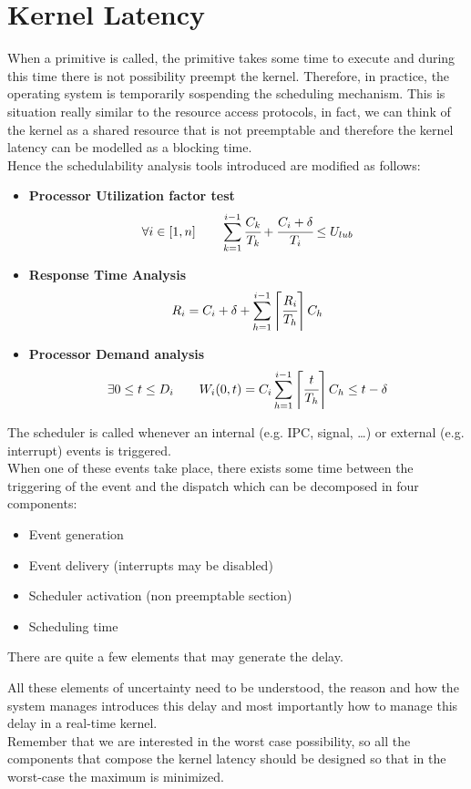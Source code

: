 \section{Kernel Latency}
When a primitive is called, the primitive takes some time to execute and during this time there is not possibility preempt the kernel. Therefore, in practice, the operating system is temporarily sospending the scheduling mechanism. This is situation really similar to the resource access protocols, in fact, we can think of the kernel as a shared resource that is not preemptable and therefore the kernel latency can be modelled as a blocking time.\\
Hence the schedulability analysis tools introduced are modified as follows:
\begin{itemize}
    \item \textbf{Processor Utilization factor test}
     \[\forall i \in [1,n] \qquad\sum_{k=1}^{i-1} \cfrac{C_k}{T_k} + \cfrac{C_i + \delta}{T_i} \le U_{lub}\]
    \item \textbf{Response Time Analysis}
    \[R_i = C_i + \delta + \sum_{h=1}^{i-1}\left\lceil \cfrac{R_i}{T_h} \right\rceil C_h\]
    \item \textbf{Processor Demand analysis}
    \[\exists 0\le t\le D_i\qquad W_i(0,t) = C_i \sum_{h=1}^{i-1}\left\lceil \cfrac{t}{T_h} \right\rceil C_h \le t-\delta\] 
\end{itemize}

The scheduler is called whenever an internal (e.g. IPC, signal, \dots) or external (e.g. interrupt) events is triggered.\\
When one of these events take place, there exists some time between the triggering of the event and the dispatch which can be decomposed in four components:
\begin{itemize}
    \item Event generation 
    \item Event delivery (interrupts may be disabled)
    \item Scheduler activation (non preemptable section)
    \item Scheduling time
\end{itemize}
There are quite a few elements that may generate the delay.

All these elements of uncertainty need to be understood, the reason and how the system manages introduces this delay and most importantly how to manage this delay in a real-time kernel.\\
Remember that we are interested in the worst case possibility, so all the components that compose the kernel latency should be designed so that in the worst-case the maximum is minimized.

